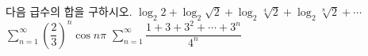 다음 급수의 합을 구하시오.
 $\log_{2}2+\log_{2}\sqrt{2}+\log_{2}\sqrt[4]{2}+\log_{2}\sqrt[8]{2}+\cdots$
 $\displaystyle\sum_{n=1}^{\infty}\left(\dfrac{2}{3}\right)^{n}\cos n\pi$
 $\displaystyle\sum_{n=1}^{\infty}\dfrac{1+3+3^{2}+\cdots+3^{n}}{4^{n}}$
